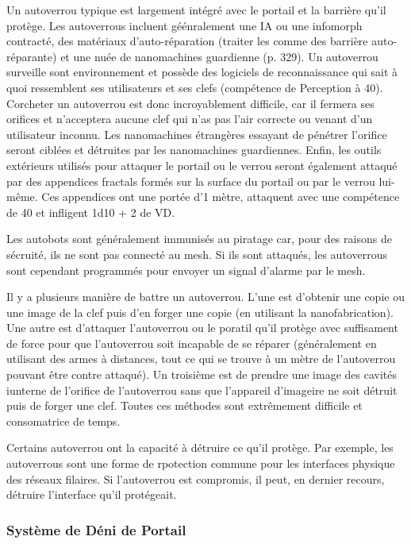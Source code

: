 Un autoverrou typique est largement intégré avec le portail et la barrière qu'il protège. Les autoverrous incluent géénralement une IA ou une infomorph contracté, des matériaux d'auto-réparation (traiter les comme des barrière auto-réparante) et une nuée de nanomachines guardienne (p. 329). Un autoverrou surveille sont environnement et possède des logiciels de reconnaissance qui sait à quoi ressemblent ses utilisateurs et ses clefs (compétence de Perception à 40). Corcheter un autoverrou est donc incroyablement difficile, car il fermera ses orifices et n'acceptera aucune clef qui n'as pas l'air correcte ou venant d'un utilisateur inconnu. Les nanomachines étrangères essayant de pénétrer l'orifice seront ciblées et détruites par les nanomachines guardiennes. Enfin, les outils extérieurs utilisés pour attaquer le portail ou le verrou seront également attaqué par des appendices fractals formés sur la surface du portail ou par le verrou lui-même. Ces appendices ont une portée d'1 mètre, attaquent avec une compétence de 40 et infligent 1d10 + 2 de VD. 

Les autobots sont généralement immunisés au piratage car, pour des raisons de sécruité, ils ne sont pas connecté au mesh. Si ils sont attaqués, les autoverrous sont cependant programmés pour envoyer un signal d'alarme par le mesh. 

Il y a plusieurs manière de battre un autoverrou. L'une est d'obtenir une copie ou une image de la clef puis d'en forger une copie (en utilisant la nanofabrication). Une autre est d'attaquer l'autoverrou ou le poratil qu'il protège avec suffisament de force pour que l'autoverrou soit incapable de se réparer (généralement en utilisant des armes à distances, tout ce qui se trouve à un mètre de l'autoverrou pouvant être contre attaqué). Un troisième est de prendre une image des cavités iunterne de l'orifice de l'autoverrou sans que l'appareil d'imageire ne soit détruit puis de forger une clef. Toutes ces méthodes sont extrêmement difficile et consomatrice de temps. 

Certains autoverrou ont la capacité à détruire ce qu'il protège. Par exemple, les autoverrous sont une forme de rpotection commune pour les interfaces physique des réseaux filaires. Si l'autoverrou est compromis, il peut, en dernier recours, détruire l'interface qu'il protégeait. 

\subsubsection{Système de Déni de Portail} 

